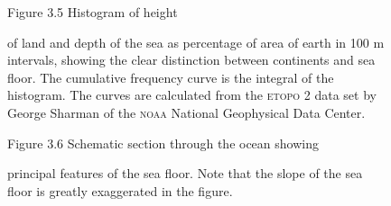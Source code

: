 \begin{figure}[t!]
\footnotesize
Figure 3.5 Histogram of height\rule{0pt}{3ex} of land and depth of the
sea as percentage of area of earth in 100 m intervals, showing the
clear distinction between continents and sea floor. The cumulative
frequency curve is the integral of the histogram. The curves are
calculated from the \textsc{etopo} 2 data set by George Sharman of the
\textsc{noaa} National Geophysical Data Center.
\label{fig:depth-r}
\vspace{-3ex}
\end{figure}

\begin{figure}[b!]
\centering
\vspace{-2ex}
\footnotesize
Figure 3.6 Schematic section through the ocean showing\rule{0pt}{4ex}
principal features of the sea floor. Note that the slope of the sea
floor is greatly exaggerated in the figure.
\label{fig:bathysketch}
\end{figure}

